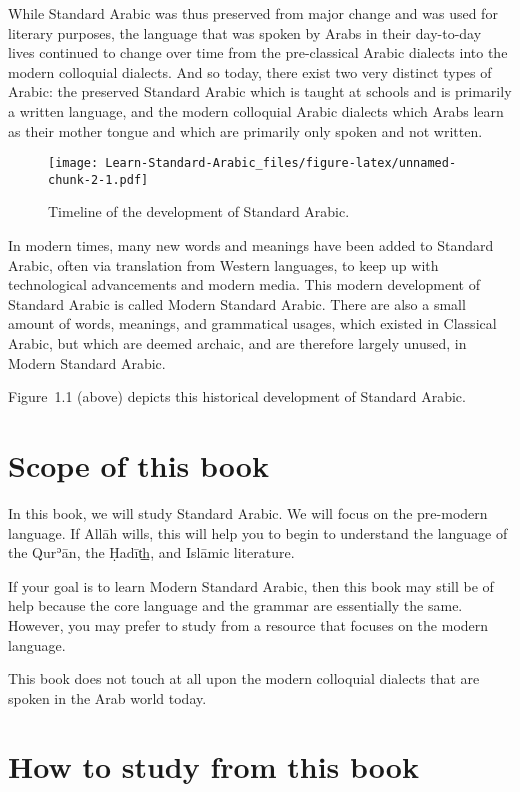 \documentclass[
  10pt,
]{book}
\begin{document}
While Standard Arabic was thus preserved from major change and was used for literary purposes, the language that was spoken by Arabs in their day-to-day lives continued to change over time from the pre-classical Arabic dialects into the modern colloquial dialects. And so today, there exist two very distinct types of Arabic: the preserved Standard Arabic which is taught at schools and is primarily a written language, and the modern colloquial Arabic dialects which Arabs learn as their mother tongue and which are primarily only spoken and not written.

\begin{figure}
\centering
\texttt{[image: Learn-Standard-Arabic\_files/figure-latex/unnamed-chunk-2-1.pdf]}
\caption{\label{fig:unnamed-chunk-2}Timeline of the development of Standard Arabic.}
\end{figure}

In modern times, many new words and meanings have been added to Standard Arabic, often via translation from Western languages, to keep up with technological advancements and modern media.
This modern development of Standard Arabic is called Modern Standard Arabic.
There are also a small amount of words, meanings, and grammatical usages, which existed in Classical Arabic, but which are deemed archaic, and are therefore largely unused, in Modern Standard Arabic.

Figure~1.1 (above) depicts this historical development of Standard Arabic.

\section{Scope of this book}\label{scope-of-this-book}

In this book, we will study Standard Arabic. We will focus on the pre-modern language. If Allāh wills, this will help you to begin to understand the language of the Qurʾān, the Ḥadīt͟h, and Islāmic literature.

If your goal is to learn Modern Standard Arabic, then this book may still be of help because the core language and the grammar are essentially the same. However, you may prefer to study from a resource that focuses on the modern language.

This book does not touch at all upon the modern colloquial dialects that are spoken in the Arab world today.

\section{How to study from this book}\label{how-to-study-from-this-book}
\end{document}
